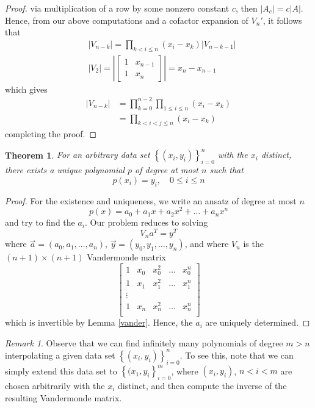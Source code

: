 \documentclass[12pt]{article}
\theoremstyle{plain}
\newtheorem{theorem}{Theorem}
\theoremstyle{definition}
\theoremstyle{remark}
\newtheorem*{remark}{Remark}
\numberwithin{equation}{section}  %
\begin{document}
\begin{proof}
via multiplication of a row by some nonzero constant $c$, then
$|A_c| = c |A|$. Hence, from our above computations and a cofactor expansion
of $V_n'$, it follows that 
\begin{align*}
& |V_{n-k}| = \prod_{k < i \le n} (x_i - x_k) |V_{n-k-1}|\\
& | V_2 | = \left |
\begin{bmatrix}
1 & x_{n-1} \\
1 & x_{n}
\end{bmatrix}
\right | = x_n - x_{n-1}
\end{align*}
which gives
\begin{align*}
|V_{n-k}| & = \prod_{k=0}^{n-2} \prod_{1 \le i \le n} (x_i - x_k)\\
& = \prod_{k < i < j \le n} (x_i - x_k)
\end{align*}
completing the proof.
\end{proof}
\begin{theorem}
For an arbitrary data set $ \left\{ (x_i, y_i) \right\}_{i = 0}^{n}$ with the $x_i$
distinct, there
exists a unique polynomial $p$ of degree at most $n$ such that
\begin{equation*}
p(x_i) = y_i, \quad 0 \le i \le n
\end{equation*}
\end{theorem}
\begin{proof}
For the existence and uniqueness, we write an ansatz of degree at most $n$
\begin{equation*}
p(x) = a_0 + a_1x + a_2x^2 + \ldots + a_nx^n
\end{equation*}
and try to find the $a_i$. 
Our problem reduces to solving
\begin{equation*}
V_n a^{T} = y^{T}
\end{equation*}
where $\vec{a} = (a_0, a_1, \ldots, a_n)$, $\vec{y} = (y_0, y_1, \ldots, y_n)$,
and where $V_n$ is the $(n+1) \times (n+1)$ Vandermonde matrix
\begin{equation*}
\begin{bmatrix}
1 & x_0 & x_0^{2} & \ldots & x_0^{n} \\
1 & x_1 & x_1^{2} & \ldots & x_1^{n} \\
\vdots \\
1 & x_n & x_n^{2} & \ldots & x_n^{n} \\
\end{bmatrix}
\end{equation*}
which is invertible by Lemma \ref{vander}. Hence, the $a_i$ are uniquely determined.
\end{proof}
\begin{remark}
Observe that we can find infinitely many polynomials of degree $m > n$
interpolating a given data set $\left\{ (x_i, y_i) \right\}_{i=0}^n$. To see
this, note that we can simply extend this data set to $ \left\{ (x_1, y_i
\right\}_{i=0}^m$, where $(x_i, y_i)$, $n < i < m$ are chosen arbitrarily with
the $x_i$ distinct, and then compute the inverse of the resulting Vandermonde
matrix.
\end{remark}
\end{document}

